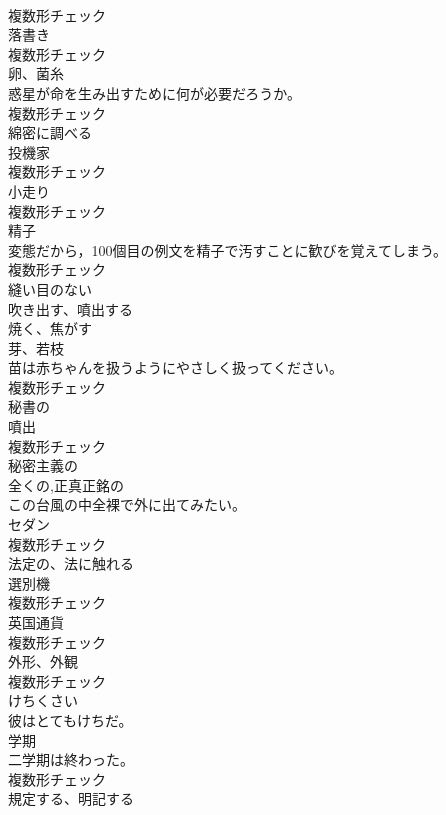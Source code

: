 \documentclass[8pt]{extreport}
\begin{document}
\begin{CJK}{UTF8}{min}
\\	複数形チェック
\\	[名詞]	落書き	
\\	複数形チェック
\\	[名詞]	卵、菌糸	
\\	惑星が命を生み出すために何が必要だろうか。	
\\	複数形チェック
\\	[動詞]	綿密に調べる	
\\	[名詞]	投機家	
\\	複数形チェック
\\	[名詞]	小走り	
\\	複数形チェック
\\	[名詞]	精子	
\\	変態だから，100個目の例文を精子で汚すことに歓びを覚えてしまう。	
\\	複数形チェック
\\	[形容詞]	縫い目のない	
\\	[動詞]	吹き出す、噴出する	
\\	[動詞]	焼く、焦がす	
\\	[名詞]	芽、若枝	
\\	苗は赤ちゃんを扱うようにやさしく扱ってください。	
\\	複数形チェック
\\	[形容詞]	秘書の	
\\	[名詞]	噴出	
\\	複数形チェック
\\	[形容詞]	秘密主義の	
\\	[形容詞]	全くの,正真正銘の	
\\	この台風の中全裸で外に出てみたい。	
\\	[名詞]	セダン	
\\	複数形チェック
\\	[形容詞]	法定の、法に触れる	
\\	[名詞]	選別機	
\\	複数形チェック
\\	[名詞]	英国通貨	
\\	複数形チェック
\\	[名詞]	外形、外観	
\\	複数形チェック
\\	[形容詞]	けちくさい	
\\	彼はとてもけちだ。	
\\	[名詞]	学期	
\\	二学期は終わった。	
\\	複数形チェック
\\	[動詞]	規定する、明記する	

\end{CJK}
\end{document}
